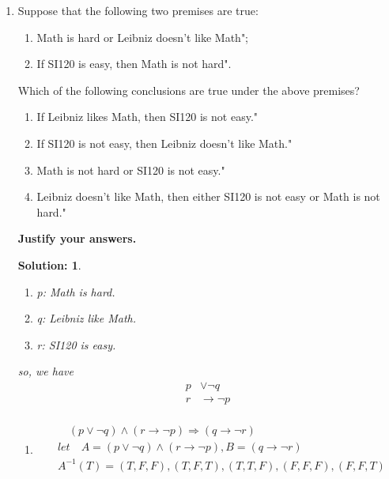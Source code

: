 \documentclass{article}
\theoremstyle{break}
\newtheorem*{solution*}{\textbf{Solution:} }
\begin{document}
\begin{enumerate}
    \newpage
    \item   Suppose that the following two premises are true:
    \begin{enumerate}
        \item  Math is hard or Leibniz doesn't like Math";
        \item  If SI120 is easy, then Math is not hard".
    \end{enumerate}
    Which of the following conclusions are true under the above premises?
    \begin{enumerate}
        \item  If Leibniz likes Math, then SI120 is not easy."
        \item  If SI120 is not easy, then Leibniz doesn't like Math."
        \item  Math is not hard or SI120 is not easy."
        \item Leibniz doesn't like Math, then either SI120 is not easy or Math is not hard."
    \end{enumerate}
    \textbf{Justify your answers.}
    \begin{solution*}\leavevmode\\
        \begin{enumerate}[]
            \item p: Math is hard.
            \item q: Leibniz like Math.
            \item r: SI120 is easy.
        \end{enumerate}
        so, we have
        \begin{equation*}
            \begin{aligned}
                p &\lor \lnot q \\
                r &\to \lnot p \\
            \end{aligned}
        \end{equation*}
        \begin{enumerate}
            \item  
            \begin{equation*}
                \begin{aligned}
                    & \quad (p \lor \lnot q) \land (r \to \lnot p) \Rightarrow (q \to \lnot r) \\
                    & let \quad A = ( p \lor \lnot q) \land (r \to \lnot p) ,  B = (q \to \lnot r) \\
                    & A^{-1}(T) = (T,F,F),(T,F,T),(T,T,F),(F,F,F),(F,F,T) \\

\end{aligned}
\end{equation*}
\end{enumerate}
\end{solution*}
\end{enumerate}
\end{document}
